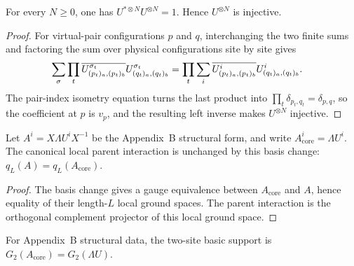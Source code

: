 \begin{lemma}
    \label{thm:appendixB_physical_isometry_tensor_power}
    \leanok
    For every $N\geq 0$, one has
    $U^{*\otimes N}U^{\otimes N}=1$. Hence $U^{\otimes N}$ is injective.
\end{lemma}

\begin{proof}
    \leanok
    For virtual-pair configurations $p$ and $q$, interchanging the two finite
    sums and factoring the sum over physical configurations site by site gives
    \begin{align}
        \sum_\sigma
        \prod_t
        \overline{U^{\sigma_t}_{(p_t)_a,(p_t)_b}}
        U^{\sigma_t}_{(q_t)_a,(q_t)_b}
         & =
        \prod_t
        \sum_i
        \overline{U^i_{(p_t)_a,(p_t)_b}}
        U^i_{(q_t)_a,(q_t)_b}.
        \notag
    \end{align}
    The pair-index isometry equation turns the last product into
    $\prod_t\delta_{p_t,q_t}=\delta_{p,q}$, so the coefficient at $p$
    is $v_p$, and the resulting left inverse makes $U^{\otimes N}$ injective.
\end{proof}

\begin{lemma}
    \label{lem:appendixB_basis_change_parent_interaction}
    \leanok
    Let $A^i=X\Lambda U^iX^{-1}$ be the Appendix~B structural form, and write
    $A_{\mathrm{core}}^i=\Lambda U^i$. The canonical local parent interaction
    is unchanged by this basis change:
    $q_L(A)=q_L(A_{\mathrm{core}})$.
\end{lemma}

\begin{proof}
    \leanok
    The basis change gives a gauge equivalence between $A_{\mathrm{core}}$ and
    $A$, hence equality of their length-$L$ local ground spaces. The parent
    interaction is the orthogonal complement projector of this local ground
    space.
\end{proof}

\begin{definition}
    \label{def:appendixB_two_site_basic_space}
    \leanok
    For Appendix~B structural data, the two-site basic support is
    $G_2(A_{\mathrm{core}})=G_2(\Lambda U)$.
\end{definition}

